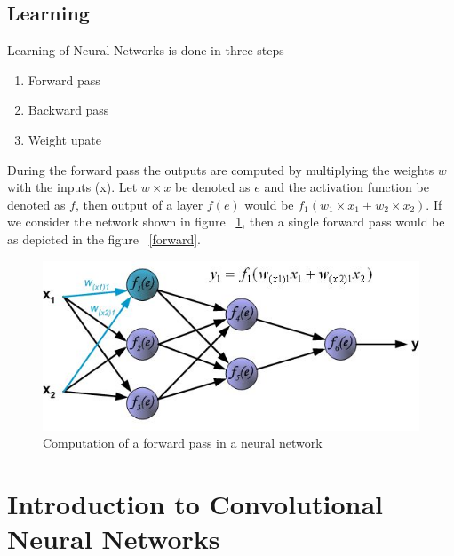 \subsection{Learning}

Learning of Neural Networks is done in three steps --

\begin{enumerate}
	\item Forward pass
	\item Backward pass
	\item Weight upate
\end{enumerate}

During the forward pass the outputs are computed by multiplying the weights $w$ with the inputs (x). Let $w \times x$ be denoted as $e$ and the activation function be denoted as $f$, then output of a layer $f(e)$ would be $f_1(w_1 \times x_1 + w_2 \times x_2)$. 
If we consider the network shown in figure ~\ref{fig:ann}, then a single forward pass would be as depicted in the figure ~\ref{forward}.

\begin{figure}[H]
	\centering
   \includegraphics[scale=0.66]{figures/intro/forward.bmp}
   \caption[Forward pass]{Computation of a forward pass in a neural network}
   \label{fig:ann}
\end{figure}

\section{Introduction to Convolutional Neural Networks}